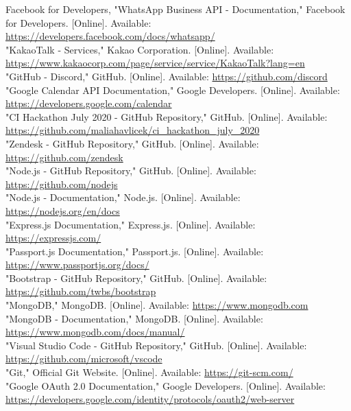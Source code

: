 \documentclass[conference]{IEEEtran}
\begin{document}
\begin{thebibliography}{00}
 Facebook for Developers, "WhatsApp Business API - Documentation," Facebook for Developers. [Online]. Available: \url{https://developers.facebook.com/docs/whatsapp/}\\
 "KakaoTalk - Services," Kakao Corporation. [Online]. Available: \url{https://www.kakaocorp.com/page/service/service/KakaoTalk?lang=en}\\
 "GitHub - Discord," GitHub. [Online]. Available: \url{https://github.com/discord}\\
 "Google Calendar API Documentation," Google Developers. [Online]. Available: \url{https://developers.google.com/calendar}\\
 "CI Hackathon July 2020 - GitHub Repository," GitHub. [Online]. Available: \url{https://github.com/maliahavlicek/ci\_hackathon\_july\_2020}\\
 "Zendesk - GitHub Repository," GitHub. [Online]. Available: \url{https://github.com/zendesk}\\
 "Node.js - GitHub Repository," GitHub. [Online]. Available: \url{https://github.com/nodejs}\\
 "Node.js - Documentation," Node.js. [Online]. Available: \url{https://nodejs.org/en/docs}\\
 "Express.js Documentation," Express.js. [Online]. Available: \url{https://expressjs.com/}\\
 "Passport.js Documentation," Passport.js. [Online]. Available: \url{https://www.passportjs.org/docs/}\\
 "Bootstrap - GitHub Repository," GitHub. [Online]. Available: \url{https://github.com/twbs/bootstrap}\\
 "MongoDB," MongoDB. [Online]. Available: \url{https://www.mongodb.com}\\
 "MongoDB - Documentation," MongoDB. [Online]. Available: \url{https://www.mongodb.com/docs/manual/}\\
 "Visual Studio Code - GitHub Repository," GitHub. [Online]. Available: \url{https://github.com/microsoft/vscode}\\
 "Git," Official Git Website. [Online]. Available: \url{https://git-scm.com/}\\
 "Google OAuth 2.0 Documentation," Google Developers. [Online]. Available: \url{https://developers.google.com/identity/protocols/oauth2/web-server}\\

\end{thebibliography}
\end{document}

